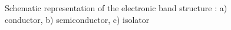 \begin{figure}[h]
\centering

\caption{Schematic representation of the electronic band structure \citep{marucco2006}: 
a) conductor, b) semiconductor, c) isolator}
\label{fig_band_model}
\end{figure}

